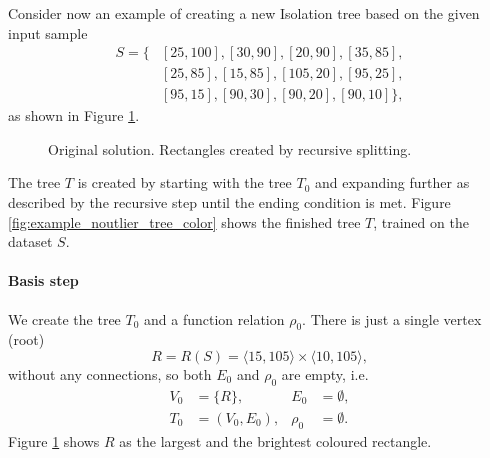 \begin{example}
\label{example:original_tree_create}
Consider now an example of creating a new Isolation tree based on the given input sample
\begin{align*}
    S = \{&[25,100],[30,90],[20,90],[35,85],\\
    &[25,85],[15,85],[105,20],[95,25], \\
    &[95,15],[90,30],[90,20],[90,10]\},
\end{align*}
as shown in Figure \ref{fig:example_noutlier_gnu}.

\begin{figure}[htbp]
\centering

\caption{Original solution. Rectangles created by recursive splitting.}
\label{fig:example_noutlier_gnu}
\end{figure}

The tree $T$ is created by starting with the tree $T_0$ and expanding further as described by the recursive step until the ending condition is met.
Figure \ref{fig:example_noutlier_tree_color} shows the finished tree $T$, trained on the dataset $S$.

\paragraph{Basis step} 
We create the tree $T_0$ and a function relation $\rho_0$.
   There is just a single vertex (root) 
   \[R = R(S) = \langle 15, 105 \rangle \times \langle 10, 105 \rangle,\]
   without any connections, so both $E_0$ and $\rho_0$ are empty, i.e.
\begin{align*}
V_0 &= \{R\},& E_0 &= \emptyset,\\
T_0 &= (V_0, E_0),& \rho_0 &= \emptyset.
\end{align*}
Figure \ref{fig:example_noutlier_gnu} shows $R$ as the largest and the brightest coloured rectangle.


\end{example}
